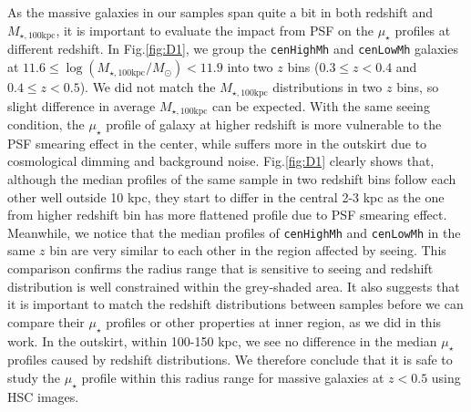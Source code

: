 \documentclass{emulateapj}
\def\rbcg{\texttt{cenHighMh}}
\def\nbcg{\texttt{cenLowMh}}
\def\mtot{{$M_{\star,100\mathrm{kpc}}$}}
\def\logmtot{{$\log (M_{\star,100\mathrm{kpc}}/M_{\odot})$}}
\def\mden{{$\mu_{\star}$}}
\begin{document}
\begin{CJK*}{UTF8}{gbsn}
    As the massive galaxies in our samples span quite a bit in both redshift and \mtot{}, 
    it is important to evaluate the impact from PSF on the \mden{} profiles at different 
    redshift. 
    In Fig.\ref{fig:D1}, we group the \rbcg{} and \nbcg{} galaxies at  
    $11.6 \le$\logmtot$< 11.9$ into two $z$ bins ($0.3\leq z<0.4$ and 
    $0.4\leq z<0.5$). 
    We did not match the \mtot{} distributions in two $z$ bins, so slight difference in 
    average \mtot{} can be expected. 
    With the same seeing condition, the \mden{} profile of galaxy at higher redshift is 
    more vulnerable to the PSF smearing effect in the center, while suffers more in the 
    outskirt due to cosmological dimming and background noise.  
    Fig.\ref{fig:D1} clearly shows that, although the median profiles of the same sample 
    in two redshift bins follow each other well outside 10 kpc, they start to differ in 
    the central 2-3 kpc as the one from higher redshift bin has more flattened profile 
    due to PSF smearing effect.  
    Meanwhile, we notice that the median profiles of \rbcg{} and \nbcg{} in the 
    same $z$ bin are very similar to each other in the region affected by seeing.   
    This comparison confirms the radius range that is sensitive to seeing and 
    redshift distribution is well constrained within the grey-shaded area.
    It also suggests that it is important to match the redshift distributions between 
    samples before we can compare their \mden{} profiles or other properties at inner 
    region, as we did in this work. 
    In the outskirt, within 100-150 kpc, we see no difference in the median \mden{} 
    profiles caused by redshift distributions. 
    We therefore conclude that it is safe to study the \mden{} profile within this 
    radius range for massive galaxies at $z<0.5$ using HSC images. 
     

\clearpage




\end{CJK*}

\clearpage 

\label{lastpage}
\end{document}

